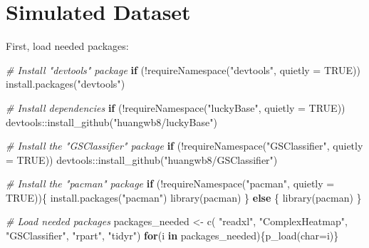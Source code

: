 \documentclass[
  12pt,
]{book}
\newenvironment{Shaded}{\begin{snugshade}}{\end{snugshade}}
\newcommand{\AttributeTok}[1]{\textcolor[rgb]{0.77,0.63,0.00}{#1}}
\newcommand{\CommentTok}[1]{\textcolor[rgb]{0.56,0.35,0.01}{\textit{#1}}}
\newcommand{\ConstantTok}[1]{\textcolor[rgb]{0.00,0.00,0.00}{#1}}
\newcommand{\ControlFlowTok}[1]{\textcolor[rgb]{0.13,0.29,0.53}{\textbf{#1}}}
\newcommand{\FunctionTok}[1]{\textcolor[rgb]{0.00,0.00,0.00}{#1}}
\newcommand{\NormalTok}[1]{#1}
\newcommand{\OtherTok}[1]{\textcolor[rgb]{0.56,0.35,0.01}{#1}}
\newcommand{\SpecialCharTok}[1]{\textcolor[rgb]{0.00,0.00,0.00}{#1}}
\newcommand{\StringTok}[1]{\textcolor[rgb]{0.31,0.60,0.02}{#1}}
\begin{document}
\hypertarget{simulated-dataset}{%
\section{Simulated Dataset}\label{simulated-dataset}}

First, load needed packages:

\begin{Shaded}
\begin{Highlighting}[]

\CommentTok{\# Install "devtools" package}
\ControlFlowTok{if}\NormalTok{ (}\SpecialCharTok{!}\FunctionTok{requireNamespace}\NormalTok{(}\StringTok{"devtools"}\NormalTok{, }\AttributeTok{quietly =} \ConstantTok{TRUE}\NormalTok{))}
  \FunctionTok{install.packages}\NormalTok{(}\StringTok{"devtools"}\NormalTok{)}

\CommentTok{\# Install dependencies}
\ControlFlowTok{if}\NormalTok{ (}\SpecialCharTok{!}\FunctionTok{requireNamespace}\NormalTok{(}\StringTok{"luckyBase"}\NormalTok{, }\AttributeTok{quietly =} \ConstantTok{TRUE}\NormalTok{))}
\NormalTok{  devtools}\SpecialCharTok{::}\FunctionTok{install\_github}\NormalTok{(}\StringTok{"huangwb8/luckyBase"}\NormalTok{)}

\CommentTok{\# Install the "GSClassifier" package}
\ControlFlowTok{if}\NormalTok{ (}\SpecialCharTok{!}\FunctionTok{requireNamespace}\NormalTok{(}\StringTok{"GSClassifier"}\NormalTok{, }\AttributeTok{quietly =} \ConstantTok{TRUE}\NormalTok{))}
\NormalTok{  devtools}\SpecialCharTok{::}\FunctionTok{install\_github}\NormalTok{(}\StringTok{"huangwb8/GSClassifier"}\NormalTok{)}

\CommentTok{\# Install the "pacman" package}
\ControlFlowTok{if}\NormalTok{ (}\SpecialCharTok{!}\FunctionTok{requireNamespace}\NormalTok{(}\StringTok{"pacman"}\NormalTok{, }\AttributeTok{quietly =} \ConstantTok{TRUE}\NormalTok{))\{}
  \FunctionTok{install.packages}\NormalTok{(}\StringTok{"pacman"}\NormalTok{)}
  \FunctionTok{library}\NormalTok{(pacman)}
\NormalTok{\} }\ControlFlowTok{else}\NormalTok{ \{}
  \FunctionTok{library}\NormalTok{(pacman)}
\NormalTok{\}}

\CommentTok{\# Load needed packages}
\NormalTok{packages\_needed }\OtherTok{\textless{}{-}} \FunctionTok{c}\NormalTok{(}
  \StringTok{"readxl"}\NormalTok{,}
  \StringTok{"ComplexHeatmap"}\NormalTok{,}
  \StringTok{"GSClassifier"}\NormalTok{,}
  \StringTok{"rpart"}\NormalTok{,}
  \StringTok{"tidyr"}\NormalTok{)}
\ControlFlowTok{for}\NormalTok{(i }\ControlFlowTok{in}\NormalTok{ packages\_needed)\{}\FunctionTok{p\_load}\NormalTok{(}\AttributeTok{char=}\NormalTok{i)\}}
\end{Highlighting}
\end{Shaded}
\end{document}
